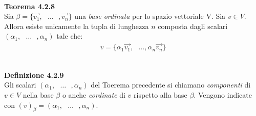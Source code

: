 \documentclass{article}
\begin{document}
\pagebreak
\textbf{\\Teorema 4.2.8}
\\ Sia $\beta=\{\vec{v_1},\text{ }\dots\text{ },\vec{v_n}\}$ una \textit{base ordinata} per lo spazio vettoriale V. Sia $v \in V$. Allora esiste unicamente la tupla di lunghezza $n$ composta dagli scalari $(\alpha_1,\text{ }\dots\text{ },\alpha_n)$ tale che:
\begin{align*}
  v=\{\alpha_1\vec{v_1},\text{ }\dots\text{},\alpha_n\vec{v_n}\}
\end{align*}

\textbf{\\Definizione 4.2.9}
\\Gli scalari $(\alpha_1,\text{ }\dots\text{ },\alpha_n)$ del Toerema precedente si chiamano \textit{componenti} di $v \in V$ nella base $\beta$ o anche \textit{cordinate} di $v$ rispetto alla base $\beta$. Vengono indicate con $(v)_\beta=(\alpha_1,\text{ }\dots\text{ },\alpha_n)$.

\vspace{10px}
\end{document}
